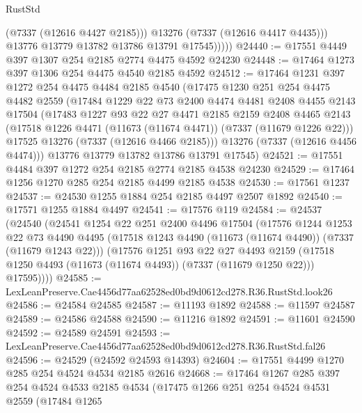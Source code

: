 \begin{lexlean}{RustStd}
\begin{coremodule}
                  (@7337 (@12616 @4427 @2185)))
                @13276
                (@7337 (@12616 @4417 @4435)))
              @13776
              @13779
              @13782
              @13786
              @13791
              @17545)))))
@24440 := @17551 @4449 @397 @1307 @254 @2185 @2774 @4475 @4592 @24230
@24448 := @17464 @1273 @397 @1306 @254 @4475 @4540 @2185 @4592
@24512 := @17464
    @1231
    @397
    @1272
    @254
    @4475
    @4484
    @2185
    @4540
    (@17475
      @1230
      @251
      @254
      @4475
      @4482
      @2559
      (@17484
        @1229
        @22
        @73
        @2400
        @4474
        @4481
        @2408
        @4455
        @2143
        @17504
        (@17483
          @1227
          @93
          @22
          @27
          @4471
          @2185
          @2159
          @2408
          @4465
          @2143
          (@17518 @1226 @4471 (@11673 (@11674 @4471)) (@7337 (@11679 @1226 @22)))
          @17525
          @13276
          (@7337 (@12616 @4466 @2185)))
        @13276
        (@7337 (@12616 @4456 @4474)))
      @13776
      @13779
      @13782
      @13786
      @13791
      @17545)
@24521 := @17551 @4484 @397 @1272 @254 @2185 @2774 @2185 @4538 @24230
@24529 := @17464 @1256 @1270 @285 @254 @2185 @4499 @2185 @4538
@24530 := @17561 @1237
@24537 := @24530 @1255 @1884 @254 @2185 @4497 @2507 @1892
@24540 := @17571 @1255 @1884 @4497
@24541 := @17576 @119
@24584 := @24537
    (@24540
      (@24541
        @1254
        @22
        @251
        @2400
        @4496
        @17504
        (@17576
          @1244
          @1253
          @22
          @73
          @4490
          @4495
          (@17518 @1243 @4490 (@11673 (@11674 @4490)) (@7337 (@11679 @1243 @22)))
          (@17576
            @1251
            @93
            @22
            @27
            @4493
            @2159
            (@17518 @1250 @4493 (@11673 (@11674 @4493)) (@7337 (@11679 @1250 @22)))
            @17595))))
@24585 := LexLeanPreserve.Cae4456d77aa62528ed0bd9d0612cd278.R36.RustStd.look26
@24586 := @24584 @24585
@24587 := @11193 @1892
@24588 := @11597 @24587
@24589 := @24586 @24588
@24590 := @11216 @1892
@24591 := @11601 @24590
@24592 := @24589 @24591
@24593 := LexLeanPreserve.Cae4456d77aa62528ed0bd9d0612cd278.R36.RustStd.fal26
@24596 := @24529 (@24592 @24593 @14393)
@24604 := @17551 @4499 @1270 @285 @254 @4524 @4534 @2185 @2616
@24668 := @17464
    @1267
    @285
    @397
    @254
    @4524
    @4533
    @2185
    @4534
    (@17475
      @1266
      @251
      @254
      @4524
      @4531
      @2559
      (@17484
        @1265

\end{coremodule}
\end{lexlean}
